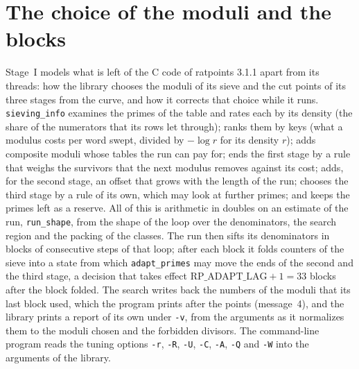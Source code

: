 \chapter{The choice of the moduli and the blocks}\label{chap:moduli}

Stage~I models what is left of the C code of ratpoints 3.1.1 apart from its threads: how the library
chooses the moduli of its sieve and the cut points of its three stages from the curve, and how it
corrects that choice while it runs. \verb|sieving_info| examines the primes of the table and rates
each by its density (the share of the numerators that its rows let through); ranks them by keys
(what a modulus costs per word swept, divided by $-\log r$ for its density $r$); adds composite
moduli whose tables the run can pay for; ends the first stage by a rule that weighs the survivors
that the next modulus removes against its cost; adds, for the second stage, an offset that grows
with the length of the run; chooses the third stage by a rule of its own, which may look at further
primes; and keeps the primes left as a reserve. All of this is arithmetic in doubles on an estimate
of the run, \verb|run_shape|, from the shape of the loop over the denominators, the search region
and the packing of the classes. The run then sifts its denominators in blocks of consecutive steps
of that loop; after each block it folds counters of the sieve into a state from which
\verb|adapt_primes| may move the ends of the second and the third stage, a decision that takes
effect $\mathrm{RP\_ADAPT\_LAG} + 1 = 33$ blocks after the block folded. The search writes back the
numbers of the moduli that its last block used, which the program prints after the points
(message~4), and the library prints a report of its own under \verb|-v|, from the arguments as it
normalizes them to the moduli chosen and the forbidden divisors. The command-line program reads the
tuning options \verb|-r|, \verb|-R|, \verb|-U|, \verb|-C|, \verb|-A|, \verb|-Q| and \verb|-W| into
the arguments of the library.

